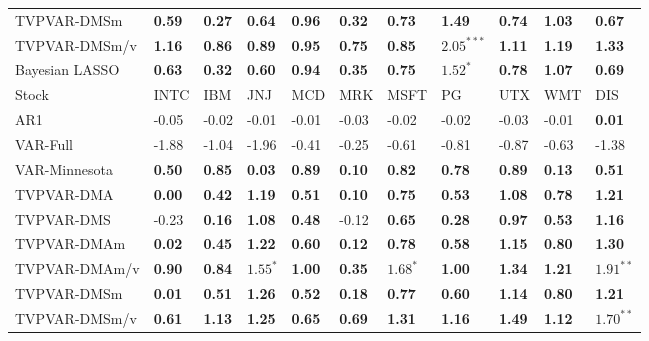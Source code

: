 \begin{table}[h!]
{\begin{center}
\begin{tabularx}{1\textwidth}{@{}X@{\hspace{0.1cm}}l@{\hspace{0.1cm}}l@{\hspace{0.1cm}}l@{\hspace{0.1cm}}l@{\hspace{0.1cm}}l@{\hspace{0.1cm}}l@{\hspace{0.1cm}}l@{\hspace{0.1cm}}l@{\hspace{0.1cm}}l@{\hspace{0.1cm}}l@{}}
 TVPVAR-DMSm  & \textbf{0.59}	 & \textbf{0.27}	 & \textbf{0.64}	 & \textbf{0.96}	 & \textbf{0.32}	 & \textbf{0.73}	 & \textbf{1.49}	 & \textbf{0.74}	 & \textbf{1.03}	 & \textbf{0.67}	\\
 TVPVAR-DMSm/v  & \textbf{1.16}	 & \textbf{0.86}	 & \textbf{0.89}	 & \textbf{0.95}	 & \textbf{0.75}	 & \textbf{0.85}	 & $\mathbf{2.05^{***}}$	 & \textbf{1.11}	 & \textbf{1.19}	 & \textbf{1.33}	\\
\midrule
 Bayesian LASSO  & \textbf{0.63}	 & \textbf{0.32}	 & \textbf{0.60}	 & \textbf{0.94}	 & \textbf{0.35}	 & \textbf{0.75}	 & $\mathbf{1.52^{*}}$	 & \textbf{0.78}	 & \textbf{1.07}	 & \textbf{0.69}	\\
\midrule
\midrule
 Stock  & INTC	 & IBM	 & JNJ	 & MCD	 & MRK	 & MSFT	 & PG	 & UTX	 & WMT	 & DIS	\\
\midrule
 AR1  & -0.05	 & -0.02	 & -0.01	 & -0.01	 & -0.03	 & -0.02	 & -0.02	 & -0.03	 & -0.01	 & \textbf{0.01}	\\
 VAR-Full  & -1.88	 & -1.04	 & -1.96	 & -0.41	 & -0.25	 & -0.61	 & -0.81	 & -0.87	 & -0.63	 & -1.38	\\
 VAR-Minnesota  & \textbf{0.50}	 & \textbf{0.85}	 & \textbf{0.03}	 & \textbf{0.89}	 & \textbf{0.10}	 & \textbf{0.82}	 & \textbf{0.78}	 & \textbf{0.89}	 & \textbf{0.13}	 & \textbf{0.51}	\\
\midrule
 TVPVAR-DMA  & \textbf{0.00}	 & \textbf{0.42}	 & \textbf{1.19}	 & \textbf{0.51}	 & \textbf{0.10}	 & \textbf{0.75}	 & \textbf{0.53}	 & \textbf{1.08}	 & \textbf{0.78}	 & \textbf{1.21}	\\
 TVPVAR-DMS  & -0.23	 & \textbf{0.16}	 & \textbf{1.08}	 & \textbf{0.48}	 & -0.12	 & \textbf{0.65}	 & \textbf{0.28}	 & \textbf{0.97}	 & \textbf{0.53}	 & \textbf{1.16}	\\
\midrule
 TVPVAR-DMAm  & \textbf{0.02}	 & \textbf{0.45}	 & \textbf{1.22}	 & \textbf{0.60}	 & \textbf{0.12}	 & \textbf{0.78}	 & \textbf{0.58}	 & \textbf{1.15}	 & \textbf{0.80}	 & \textbf{1.30}	\\
 TVPVAR-DMAm/v  & \textbf{0.90}	 & \textbf{0.84}	 & $\mathbf{1.55^{*}}$	 & \textbf{1.00}	 & \textbf{0.35}	 & $\mathbf{1.68^{*}}$	 & \textbf{1.00}	 & \textbf{1.34}	 & \textbf{1.21}	 & $\mathbf{1.91^{**}}$	\\
 TVPVAR-DMSm  & \textbf{0.01}	 & \textbf{0.51}	 & \textbf{1.26}	 & \textbf{0.52}	 & \textbf{0.18}	 & \textbf{0.77}	 & \textbf{0.60}	 & \textbf{1.14}	 & \textbf{0.80}	 & \textbf{1.21}	\\
 TVPVAR-DMSm/v  & \textbf{0.61}	 & \textbf{1.13}	 & \textbf{1.25}	 & \textbf{0.65}	 & \textbf{0.69}	 & \textbf{1.31}	 & \textbf{1.16}	 & \textbf{1.49}	 & \textbf{1.12}	 & $\mathbf{1.70^{**}}$	\\

\end{tabularx}
\end{center}}
\end{table}
